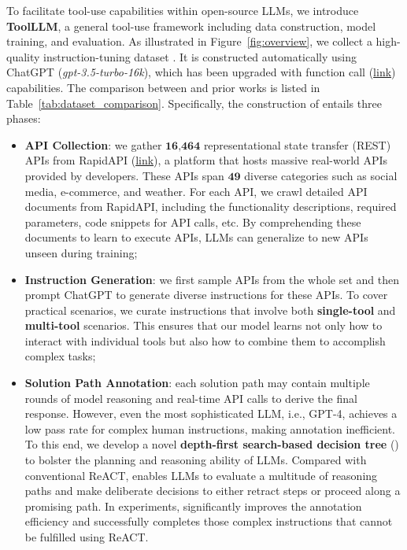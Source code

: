 To facilitate tool-use capabilities within open-source LLMs, we introduce \textbf{ToolLLM}, a general tool-use framework including data construction, model training, and evaluation.
As illustrated in Figure~\ref{fig:overview}, we collect a high-quality instruction-tuning dataset \textbf{\ourdata}. It is constructed automatically using ChatGPT (\textit{gpt-3.5-turbo-16k}), which has been upgraded with function call (\textcolor{blue}{\href{https://openai.com/blog/function-calling-and-other-api-updates}{link}}) capabilities. The comparison between \ourdata and prior works is listed in Table~\ref{tab:dataset_comparison}.
Specifically, the construction of \ourdata entails three phases: 


\begin{itemize} [topsep=1pt, partopsep=1pt, leftmargin=12pt, itemsep=-1pt]
    \item \textbf{API Collection}: we gather $\textbf{16,464}$ representational state transfer (REST) APIs from RapidAPI (\textcolor{blue}{\href{https://rapidapi.com/hub}{link}}), a platform that hosts massive real-world APIs provided by developers. 
    These APIs span $\mathbf{49}$ diverse categories such as social media, e-commerce, and weather. For each API, we crawl detailed API documents from RapidAPI, including the functionality descriptions, required parameters, code snippets for API calls, etc. By comprehending these documents to learn to execute APIs, LLMs can generalize to new APIs unseen during training;

    \item \textbf{Instruction Generation}: we first sample APIs from the whole set and then prompt ChatGPT to generate diverse instructions for these APIs. To cover practical scenarios, we curate instructions that involve both \textbf{single-tool} and \textbf{multi-tool} scenarios. This ensures that our model learns not only how to interact with individual tools but also how to combine them to accomplish complex tasks;

    \item \textbf{Solution Path Annotation}: %
    each solution path may contain multiple rounds of model reasoning and real-time API calls to derive the final response.
    However, even the most sophisticated LLM, i.e., GPT-4, achieves a low pass rate for complex human instructions, making annotation inefficient. To this end, we develop a novel \textbf{depth-first search-based decision tree} (\dfs) to bolster the planning and reasoning ability of LLMs. Compared with conventional ReACT, \dfs enables LLMs to evaluate a multitude of reasoning paths and make deliberate decisions to either retract steps or proceed along a promising path. In experiments, \dfs significantly improves the annotation efficiency and successfully completes those complex instructions that cannot be fulfilled using ReACT.
\end{itemize}

